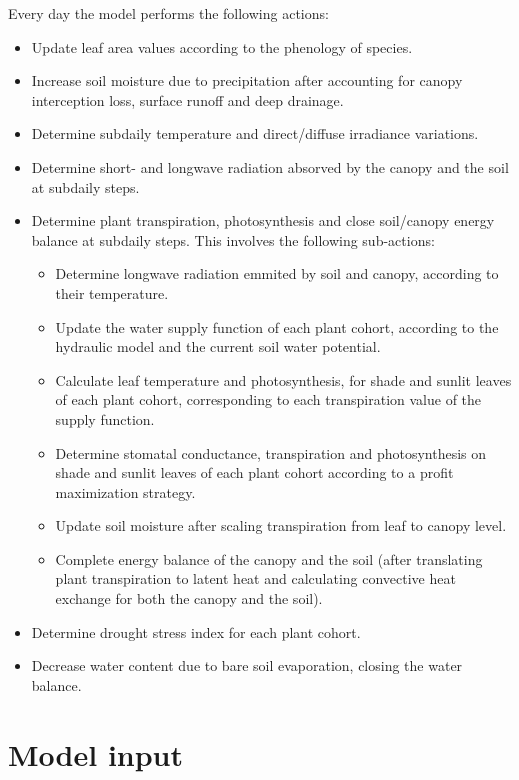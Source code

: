 \documentclass[]{book}
\providecommand{\tightlist}{%
  \setlength{\itemsep}{0pt}\setlength{\parskip}{0pt}}
\begin{document}
Every day the model performs the following actions:

\begin{itemize}
\tightlist
\item
  Update leaf area values according to the phenology of species.
\item
  Increase soil moisture due to precipitation after accounting for
  canopy interception loss, surface runoff and deep drainage.
\item
  Determine subdaily temperature and direct/diffuse irradiance
  variations.
\item
  Determine short- and longwave radiation absorved by the canopy and the
  soil at subdaily steps.
\item
  Determine plant transpiration, photosynthesis and close soil/canopy
  energy balance at subdaily steps. This involves the following
  sub-actions:

  \begin{itemize}
  \tightlist
  \item
    Determine longwave radiation emmited by soil and canopy, according
    to their temperature.
  \item
    Update the water supply function of each plant cohort, according to
    the hydraulic model and the current soil water potential.
  \item
    Calculate leaf temperature and photosynthesis, for shade and sunlit
    leaves of each plant cohort, corresponding to each transpiration
    value of the supply function.
  \item
    Determine stomatal conductance, transpiration and photosynthesis on
    shade and sunlit leaves of each plant cohort according to a profit
    maximization strategy.
  \item
    Update soil moisture after scaling transpiration from leaf to canopy
    level.
  \item
    Complete energy balance of the canopy and the soil (after
    translating plant transpiration to latent heat and calculating
    convective heat exchange for both the canopy and the soil).
  \end{itemize}
\item
  Determine drought stress index for each plant cohort.
\item
  Decrease water content due to bare soil evaporation, closing the water
  balance.
\end{itemize}

\section{Model input}\label{model-input-1}
\end{document}
